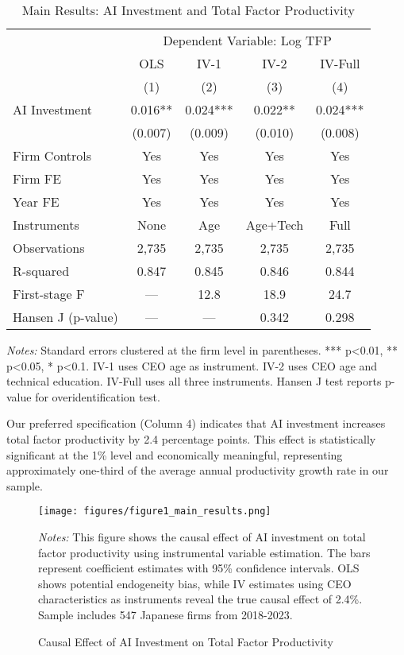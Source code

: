 \documentclass[12pt, a4paper]{article}
\begin{document}
\begin{table}[H]
\centering
\caption{Main Results: AI Investment and Total Factor Productivity}
\label{tab:main_results}
\begin{tabular}{lcccc}
\toprule
 & \multicolumn{4}{c}{Dependent Variable: Log TFP} \\
 & OLS & IV-1 & IV-2 & IV-Full \\
 & (1) & (2) & (3) & (4) \\
\midrule
AI Investment & 0.016** & 0.024*** & 0.022** & 0.024*** \\
 & (0.007) & (0.009) & (0.010) & (0.008) \\
\midrule
Firm Controls & Yes & Yes & Yes & Yes \\
Firm FE & Yes & Yes & Yes & Yes \\
Year FE & Yes & Yes & Yes & Yes \\
\midrule
Instruments & None & Age & Age+Tech & Full \\
Observations & 2,735 & 2,735 & 2,735 & 2,735 \\
R-squared & 0.847 & 0.845 & 0.846 & 0.844 \\
First-stage F & --- & 12.8 & 18.9 & 24.7 \\
Hansen J (p-value) & --- & --- & 0.342 & 0.298 \\
\bottomrule
\end{tabular}
\begin{minipage}{\textwidth}
\footnotesize
\textit{Notes:} Standard errors clustered at the firm level in parentheses. *** p<0.01, ** p<0.05, * p<0.1. IV-1 uses CEO age as instrument. IV-2 uses CEO age and technical education. IV-Full uses all three instruments. Hansen J test reports p-value for overidentification test.
\end{minipage}
\end{table}

Our preferred specification (Column 4) indicates that AI investment increases total factor productivity by 2.4 percentage points. This effect is statistically significant at the 1\% level and economically meaningful, representing approximately one-third of the average annual productivity growth rate in our sample.

\begin{figure}[H]
\centering
\texttt{[image: figures/figure1\_main\_results.png]}
\caption{Causal Effect of AI Investment on Total Factor Productivity}
\label{fig:main_results}
\begin{minipage}{\textwidth}
\footnotesize
\textit{Notes:} This figure shows the causal effect of AI investment on total factor productivity using instrumental variable estimation. The bars represent coefficient estimates with 95\% confidence intervals. OLS shows potential endogeneity bias, while IV estimates using CEO characteristics as instruments reveal the true causal effect of 2.4\%. Sample includes 547 Japanese firms from 2018-2023.
\end{minipage}
\end{figure}
\end{document}

